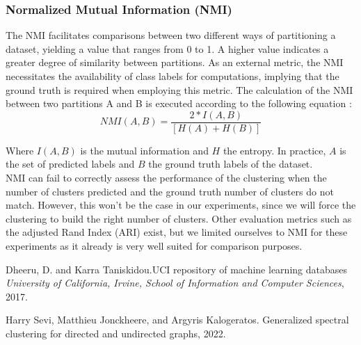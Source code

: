 \documentclass[a4paper,12pt]{article}
\theoremstyle{definition}
\theoremstyle{plain}
\begin{document}
\subsubsection{Normalized Mutual Information (NMI)}
The NMI facilitates comparisons between two different ways of partitioning a dataset, yielding a value that ranges from 0 to 1. A higher value indicates a greater degree of similarity between partitions. As an external metric, the NMI necessitates the availability of class labels for computations, implying that the ground truth is required when employing this metric.
The calculation of the NMI between two partitions A and B is executed according to the following equation :
$$NMI\left(A,B\right)=\frac{2*I(A,B)}{[H\left(A\right)+H(B)]}$$
	
	Where $I(A,B)$ is the mutual information and $H$ the entropy. 
	In practice, $A$ is the set of predicted labels and $B$ the ground truth labels of the dataset. \\ NMI can fail to correctly assess the performance of the clustering when the number of clusters predicted and the ground truth number of clusters do not match. However, this won't be the case in our experiments, since we will force the clustering to build the right number of clusters.
	Other evaluation metrics such as the adjusted Rand Index (ARI) exist, but we limited ourselves to NMI for these experiments as it already is very well suited for comparison purposes.

\newpage

\begin{thebibliography}{9}
	
	Dheeru, D. and Karra Taniskidou.UCI repository of machine learning databases \textit{University of California, Irvine, School of
	Information and Computer Sciences}, 2017.
	
	Harry Sevi, Matthieu Jonckheere, and Argyris Kalogeratos.
	Generalized spectral clustering for directed and undirected graphs,
	2022.
	
\end{thebibliography}
\end{document}
